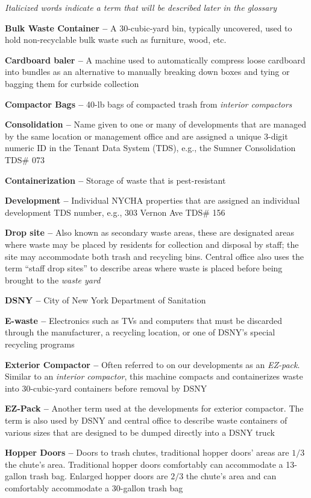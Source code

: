\textit{Italicized words indicate a term that will be described later in the glossary}

\textbf{Bulk Waste Container --} A 30-cubic-yard bin, typically uncovered, used to hold non-recyclable bulk waste such as furniture, wood, etc.

\textbf{Cardboard baler --} A machine used to automatically compress loose cardboard into bundles as an alternative to manually breaking down boxes and tying or bagging them for curbside collection

\textbf{Compactor Bags --} 40-lb bags of compacted trash from \textit{interior compactors}

\textbf{Consolidation --} Name given to one or many of developments that are managed by the same location or management office and are assigned a unique 3-digit numeric ID in the Tenant Data System (TDS), e.g., the Sumner Consolidation TDS\# 073

\textbf{Containerization --} Storage of waste that is pest-resistant

\textbf{Development --} Individual NYCHA properties that are assigned an individual development TDS number, e.g., 303 Vernon Ave TDS\# 156

\textbf{Drop site --} Also known as secondary waste areas, these are designated areas where waste may be placed by residents for collection and disposal by staff; the site may accommodate both trash and recycling bins. Central office also uses the term ``staff drop sites'' to describe areas where waste is placed before being brought to the \textit{waste yard}

\textbf{DSNY --} City of New York Department of Sanitation

\textbf{E-waste --} Electronics such as TVs and computers that must be discarded through the manufacturer, a recycling location, or one of DSNY's special recycling programs

\textbf{Exterior Compactor --} Often referred to on our developments as an \textit{EZ-pack}. Similar to an \textit{interior compactor}, this machine compacts and containerizes waste into 30-cubic-yard containers before removal by DSNY

\textbf{EZ-Pack --} Another term used at the developments for exterior compactor. The term is also used by DSNY and central office to describe waste containers of various sizes that are designed to be dumped directly into a DSNY truck

\textbf{Hopper Doors --} Doors to trash chutes, traditional hopper doors' areas are $1/3$ the chute's area. Traditional hopper doors comfortably can accommodate a 13-gallon trash bag. Enlarged hopper doors are $2/3$ the chute's area and can comfortably accommodate a 30-gallon trash bag

